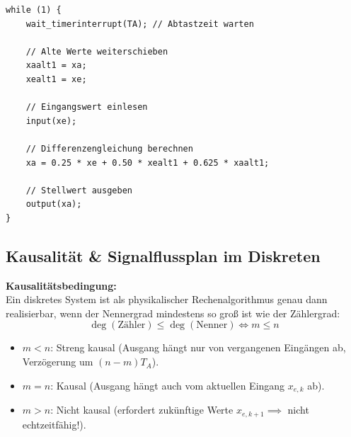 \begin{tcolorbox}
\begin{lstlisting}
while (1) {
    wait_timerinterrupt(TA); // Abtastzeit warten
    
    // Alte Werte weiterschieben
    xaalt1 = xa;
    xealt1 = xe;
    
    // Eingangswert einlesen
    input(xe);
    
    // Differenzengleichung berechnen
    xa = 0.25 * xe + 0.50 * xealt1 + 0.625 * xaalt1;
    
    // Stellwert ausgeben
    output(xa);
}
\end{lstlisting}
\end{tcolorbox}

\subsection{Kausalität \& Signalflussplan im Diskreten}
\begin{tcolorbox}
\textbf{Kausalitätsbedingung:}\\[2pt]
Ein diskretes System ist als physikalischer Rechenalgorithmus genau dann realisierbar, wenn der Nennergrad mindestens so groß ist wie der Zählergrad:
\[
\deg(\text{Zähler}) \le \deg(\text{Nenner}) \iff m \le n
\]
\begin{itemize}
  \item $m < n$: Streng kausal (Ausgang hängt nur von vergangenen Eingängen ab, Verzögerung um $(n-m) T_A$).
  \item $m = n$: Kausal (Ausgang hängt auch vom aktuellen Eingang $x_{e,k}$ ab).
  \item $m > n$: Nicht kausal (erfordert zukünftige Werte $x_{e,k+1} \implies$ nicht echtzeitfähig!).
\end{itemize}
\end{tcolorbox}
